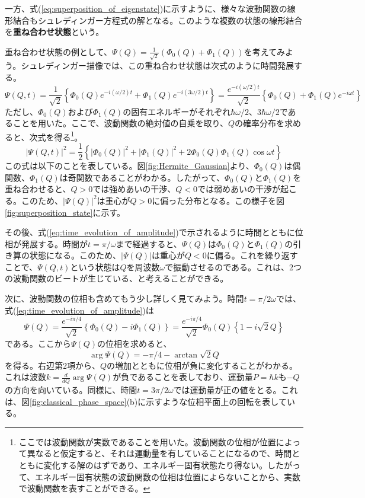 一方、式(\ref{eq:superposition_of_eigenstate})に示すように、様々な波動関数の線形結合もシュレディンガー方程式の解となる。このような複数の状態の線形結合を\textbf{重ね合わせ状態}という。

重ね合わせ状態の例として、$\Psi(Q) = \frac 1 {\sqrt 2} (\Phi_0(Q) + \Phi_1(Q))$を考えてみよう。シュレディンガー描像では、この重ね合わせ状態は次式のように時間発展する。
\begin{equation}
  \Psi(Q, t) = \frac 1 {\sqrt 2}\left\{\Phi_0(Q)e^{-i(\omega/2) t} + \Phi_1(Q)e^{-i(3\omega/2)t}\right\} = \frac{e^{-i(\omega/2)t}}{\sqrt 2}\left\{\Phi_0(Q) + \Phi_1(Q)e^{-i\omega t}\right\}
  \label{eq:time_evolution_of_amplitude}
\end{equation}
ただし、$\Phi_0(Q)$および$\Phi_1(Q)$の固有エネルギーがそれぞれ$\hbar \omega /2$、$3\hbar \omega/2$であることを用いた。ここで、波動関数の絶対値の自乗を取り、$Q$の確率分布を求めると、次式を得る\footnote{ここでは波動関数が実数であることを用いた。波動関数の位相が位置によって異なると仮定すると、それは運動量を有していることになるので、時間とともに変化する解のはずであり、エネルギー固有状態たり得ない。したがって、エネルギー固有状態の波動関数の位相は位置によらないことから、実数で波動関数を表すことができる。}。
\begin{equation}
  \left| \Psi(Q, t)\right|^2 = \frac{1}{2}\left\{|\Phi_0(Q)|^2 + |\Phi_1(Q)|^2 + 2\Phi_0(Q)\Phi_1(Q)\cos\omega t\right\}
  \label{eq:time_evolution_of_probability}
\end{equation}
この式は以下のことを表している。図\ref{fig:Hermite_Gaussian}より、$\Phi_0(Q)$は偶関数、$\Phi_1(Q)$は奇関数であることがわかる。したがって、$\Phi_0(Q)$と$\Phi_1(Q)$を重ね合わせると、$Q>0$では強めあいの干渉、$Q < 0$では弱めあいの干渉が起こる。このため、$|\Psi(Q)|^2$は重心が$Q > 0$に偏った分布となる。この様子を図\ref{fig:superposition_state}に示す。

その後、式(\ref{eq:time_evolution_of_amplitude})で示されるように時間とともに位相が発展する。時間が$t = \pi / \omega$まで経過すると、$\Psi(Q)$は$\Phi_0(Q)$と$\Phi_1(Q)$の引き算の状態になる。このため、$|\Psi(Q)|$は重心が$Q < 0$に偏る。これを繰り返すことで、$\Psi(Q, t)$という状態は$Q$を周波数$\omega$で振動させるのである。これは、2つの波動関数のビートが生じている、と考えることができる。

次に、波動関数の位相も含めてもう少し詳しく見てみよう。時間$t = \pi/2\omega$では、式(\ref{eq:time_evolution_of_amplitude})は
\begin{equation}
  \Psi(Q) = \frac{e^{-i\pi/4}}{\sqrt 2}\left\{ \Phi_0(Q) - i \Phi_1(Q)\right\} = \frac{e^{-i\pi/4}}{\sqrt 2} \Phi_0(Q) \left\{ 1 - i\sqrt 2 Q\right\} 
\end{equation}
である。ここから$\Psi(Q)$の位相を求めると、
\begin{equation}
  \arg \Psi(Q) = -\pi/4 - \arctan \sqrt 2 Q
\end{equation}
を得る。右辺第2項から、$Q$の増加とともに位相が負に変化することがわかる。これは波数$k = \frac d {dQ} \arg \Psi(Q)$が負であることを表しており、運動量$P = \hbar k$も$-Q$の方向を向いている。同様に、時間$t = 3\pi / 2\omega$では運動量が正の値をとる。これは、図\ref{fig:classical_phase_space}(b)に示すような位相平面上の回転を表している。

